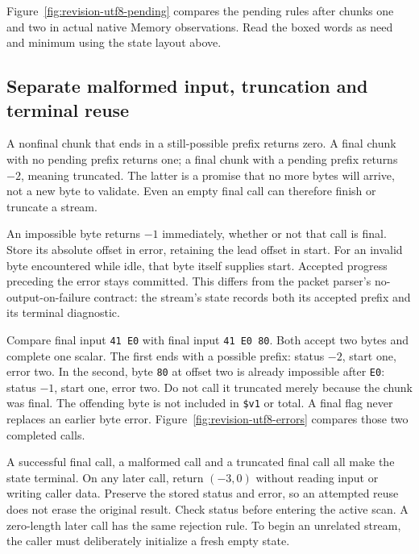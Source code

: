 Figure~\ref{fig:revision-utf8-pending} compares the pending rules after chunks
one and two in actual native Memory observations. Read the boxed words as need
and minimum using the state layout above.



\subsection*{Separate malformed input, truncation and terminal reuse}

A nonfinal chunk that ends in a still-possible prefix returns zero. A final chunk
with no pending prefix returns one; a final chunk with a pending prefix returns
$-2$, meaning truncated. The latter is a promise that no more bytes will arrive,
not a new byte to validate. Even an empty final call can therefore finish or
truncate a stream.

An impossible byte returns $-1$ immediately, whether or not that call is final.
Store its absolute offset in error, retaining the lead offset in start. For an
invalid byte encountered while idle, that byte itself supplies start. Accepted
progress preceding the error stays committed. This differs from the packet
parser's no-output-on-failure contract: the stream's state records both its
accepted prefix and its terminal diagnostic.

Compare final input \texttt{41 E0} with final input \texttt{41 E0 80}. Both
accept two bytes and complete one scalar. The first ends with a possible prefix:
status $-2$, start one, error two. In the second, byte \texttt{80} at offset two
is already impossible after \texttt{E0}: status $-1$, start one, error two. Do not
call it truncated merely because the chunk was final. The offending byte is not
included in \texttt{\$v1} or total. A final flag never replaces an earlier byte
error. Figure~\ref{fig:revision-utf8-errors} compares those two completed calls.



A successful final call, a malformed call and a truncated final call all make
the state terminal. On any later call, return $(-3,0)$ without reading input or
writing caller data. Preserve the stored status and error, so an attempted reuse
does not erase the original result. Check status before entering the active scan.
A zero-length later call has the same rejection rule. To begin an unrelated stream,
the caller must deliberately initialize a fresh empty state.


